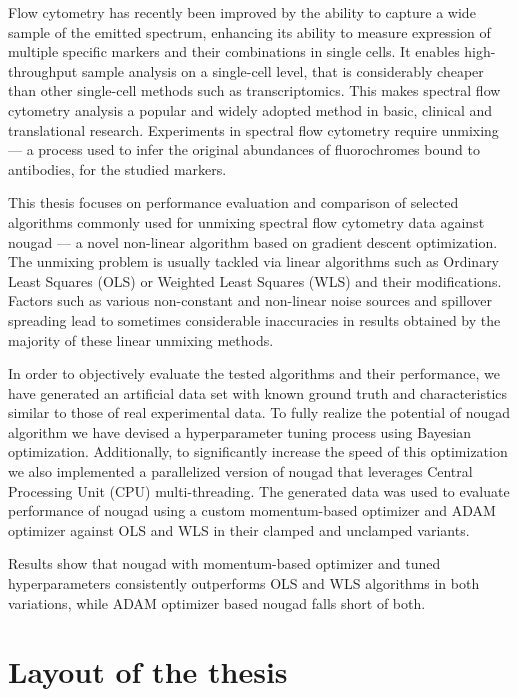 
Flow cytometry has recently been improved by the ability to capture a wide sample of the emitted spectrum, enhancing its ability to measure expression of multiple specific markers and their combinations in single cells. It enables high-throughput sample analysis on a single-cell level, that is considerably cheaper than other single-cell methods such as transcriptomics. This makes spectral flow cytometry analysis a popular and widely adopted method in basic, clinical and translational research. Experiments in spectral flow cytometry require unmixing --- a process used to infer the original abundances of fluorochromes bound to antibodies, for the studied markers.

This thesis focuses on performance evaluation and comparison of selected algorithms commonly used for unmixing spectral flow cytometry data against nougad --- a novel non-linear algorithm based on gradient descent optimization. 
The unmixing problem is usually tackled via linear algorithms such as Ordinary Least Squares (OLS) or Weighted Least Squares (WLS) and their modifications. Factors such as various non-constant and non-linear noise sources and spillover spreading lead to sometimes considerable inaccuracies in results obtained by the majority of these linear unmixing methods.

In order to objectively evaluate the tested algorithms and their performance, we have generated an artificial data set with known ground truth and characteristics similar to those of real experimental data. To fully realize the potential of nougad algorithm we have devised a hyperparameter tuning process using Bayesian optimization. Additionally, to significantly increase the speed of this optimization we also implemented a parallelized version of nougad that leverages Central Processing Unit (CPU) multi-threading. The generated data was used to evaluate performance of nougad using a custom momentum-based optimizer and ADAM optimizer against OLS and WLS in their clamped and unclamped variants.

Results show that nougad with momentum-based optimizer and tuned hyperparameters consistently outperforms OLS and WLS algorithms in both variations, while ADAM optimizer based nougad falls short of both. 



\section*{Layout of the thesis}

